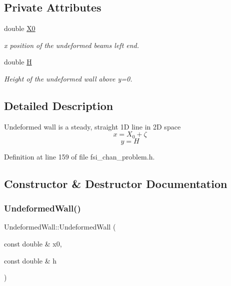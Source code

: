 \subsection*{Private Attributes}
\begin{DoxyCompactItemize}
\item 
double \hyperlink{classUndeformedWall_a7ab875c46fef905df33eb47e0336581b}{X0}
\begin{DoxyCompactList}\small\item\em x position of the undeformed beam\textquotesingle{}s left end. \end{DoxyCompactList}\item 
double \hyperlink{classUndeformedWall_a4525dbe0b5d2108ee51f16bee9af88ef}{H}
\begin{DoxyCompactList}\small\item\em Height of the undeformed wall above y=0. \end{DoxyCompactList}\end{DoxyCompactItemize}


\subsection{Detailed Description}
Undeformed wall is a steady, straight 1D line in 2D space \[ x = X_0 + \zeta \] \[ y = H \] 

Definition at line 159 of file fsi\+\_\+chan\+\_\+problem.\+h.



\subsection{Constructor \& Destructor Documentation}
\mbox{\label{classUndeformedWall_ad09cfdcd234be0ab47eb97a8a470602a}} 
\subsubsection{\texorpdfstring{Undeformed\+Wall()}{UndeformedWall()}}
{\footnotesize\ttfamily Undeformed\+Wall\+::\+Undeformed\+Wall (\begin{DoxyParamCaption}\item[{const double \&}]{x0,  }\item[{const double \&}]{h }\end{DoxyParamCaption})\hspace{0.3cm}{\ttfamily [inline]}}



